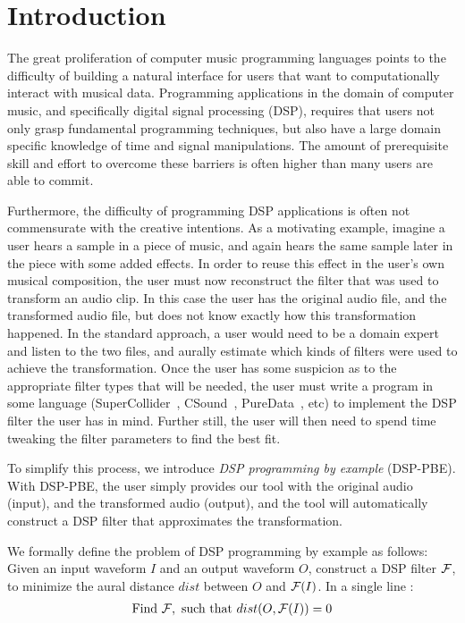 \section{Introduction}

The great proliferation of computer music programming languages points to the difficulty of building a natural interface for users that want to computationally interact with musical data.
Programming applications in the domain of computer music, and specifically digital signal processing (DSP), requires that users not only grasp fundamental programming techniques, but also have a large domain specific knowledge of time and signal manipulations.
The amount of prerequisite skill and effort to overcome these barriers is often higher than many users are able to commit.

Furthermore, the difficulty of programming DSP applications is often not commensurate with the creative intentions. 
As a motivating example, imagine a user hears a sample in a piece of music, and again hears the same sample later in the piece with some added effects.
In order to reuse this effect in the user's own musical composition, the user must now reconstruct the filter that was used to transform an audio clip. 
In this case the user has the original audio file, and the transformed audio file, but does not know exactly how this transformation happened.
In the standard approach, a user would need to be a domain expert and listen to the two files, and aurally estimate which kinds of filters were used to achieve the transformation. 
Once the user has some suspicion as to the appropriate filter types that will be needed, the user must write a program in some language (SuperCollider~\cite{supercollider}, CSound~\cite{csound}, PureData~\cite{puredata}, etc) to implement the DSP filter the user has in mind. 
Further still, the user will then need to spend time tweaking the filter parameters to find the best fit. 


To simplify this process, we introduce \textit{DSP programming by example} (DSP-PBE). 
With DSP-PBE, the user simply provides our tool with the original audio (input), and the transformed audio (output), and the tool will automatically construct a DSP filter that approximates the transformation.

We formally define the problem of DSP programming by example as follows:
Given an input waveform $I$ and an output waveform $O$, construct a DSP filter $\mathcal{F}$, to minimize the aural distance $dist$ between $O$ and $\mathcal{F}(I)$.
In a single line :
%
\begin{align*}
\text{Find } \mathcal{F}, \text{ such that } dist(O,\mathcal{F}(I))=0
\end{align*}



